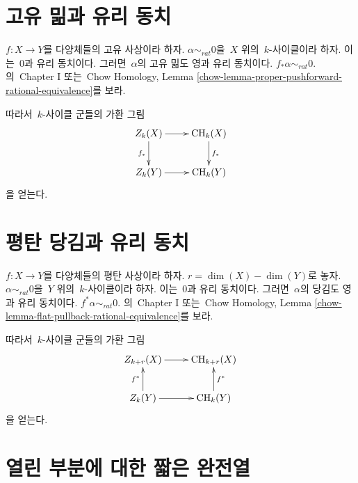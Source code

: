 \section{고유 밂과 유리 동치}
\label{section-pushforward-and-rational-equivalence}

\noindent
$f : X \to Y$를 다양체들의 고유 사상이라 하자.
$\alpha \sim_{rat} 0$을\  $X$ 위의\  $k$-사이클이라 하자. 이는\  $0$과
유리 동치이다.
그러면\  $\alpha$의 {고유 밂}도 영과 유리 동치이다.
$f_* \alpha \sim_{rat} 0$.
\cite{F}의\  Chapter I 또는\  Chow Homology, Lemma
\ref{chow-lemma-proper-pushforward-rational-equivalence}를 보라.

\medskip\noindent
따라서\  $k$-사이클 군들의 가환 그림
$$
\xymatrix{
Z_k(X) \ar[r] \ar[d]_{f_*} & \CH_k(X) \ar[d]^{f_*} \\
Z_k(Y) \ar[r] & \CH_k(Y)
}
$$
을 얻는다.


\section{평탄 당김과 유리 동치}
\label{section-flat-pullback-and-rational-equivalence}

\noindent
$f : X \to Y$를 다양체들의 평탄 사상이라 하자.
$r = \dim(X) - \dim(Y)$로 놓자.
$\alpha \sim_{rat} 0$을\  $Y$ 위의\  $k$-사이클이라 하자. 이는\  $0$과
유리 동치이다.
그러면\  $\alpha$의 당김도 영과 유리 동치이다.
$f^* \alpha \sim_{rat} 0$.
\cite{F}의\  Chapter I 또는\  Chow Homology, Lemma
\ref{chow-lemma-flat-pullback-rational-equivalence}를 보라.

\medskip\noindent
따라서\  $k$-사이클 군들의 가환 그림
$$
\xymatrix{
Z_{k + r}(X) \ar[r] & \CH_{k + r}(X) \\
Z_k(Y) \ar[r] \ar[u]^{f^*} & \CH_k(Y) \ar[u]_{f^*}
}
$$
을 얻는다.


\section{열린 부분에 대한 짧은 완전열}
\label{section-ses}


